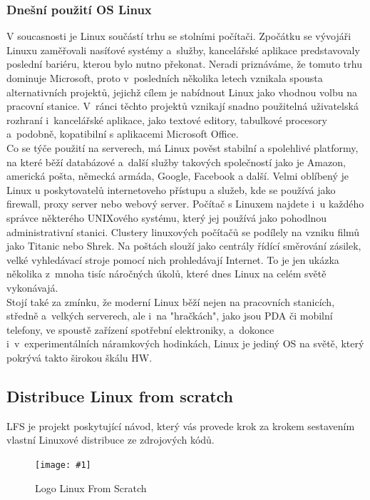 \documentclass[a4paper,12pt]{article}
\newcommand{\obr}[3]{%
	\begin{figure}[h]
	\center\texttt{[image: \#1]}
	\caption{#3}
	\end{figure}
	}
\begin{document}
\subsubsection{Dnešní použití OS Linux}
V soucasnosti je Linux součástí trhu se stolními počítači. Zpočátku se vývojáři Linuxu zaměřovali nasíťové systémy a~služby, kancelářské aplikace predstavovaly poslední bariéru, kterou bylo nutno překonat. Neradi priznáváme, že tomuto trhu dominuje Microsoft, proto v~posledních několika letech vznikala spousta alternativních projektů, jejichž cílem je nabídnout Linux jako vhodnou volbu na pracovní stanice. V~ránci těchto projektů vznikají snadno použitelná uživatelská rozhraní i~kancelářské aplikace, jako textové editory, tabulkové procesory a~podobně, kopatibilní s aplikacemi Microsoft Office.\\
Co se týče použití na serverech, má Linux pověst stabilní a spolehlivé platformy, na které běží databázové a~další služby takových společností jako je Amazon, americká pošta, německá armáda, Google, Facebook a další. Velmi oblíbený je Linux u poskytovatelů internetoveho přístupu a služeb, kde se používá jako firewall, proxy server nebo webový server. Počítač s Linuxem najdete i~u každého správce některého UNIXového systému, který jej používá jako pohodlnou administrativní stanici. Clustery linuxových počítačů se podílely na vzniku filmů jako Titanic nebo Shrek. Na poštách slouží jako centrály řídící směrování zásilek, velké vyhledávací stroje pomocí nich prohledávají Internet. To je jen ukázka několika z~mnoha tisíc náročných úkolů, které dnes Linux na celém světě vykonávajá.\\
Stojí také za zmínku, že moderní Linux běží nejen na pracovních stanicích, středně a~velkých serverech, ale i~na "hračkách", jako jsou PDA či mobilní telefony, ve spoustě zařízení spotřební elektroniky, a~dokonce i~v~experimentálních náramkových hodinkách, Linux je jediný OS na světě, který pokrývá takto širokou škálu HW.~\cite{LDP}

\newpage

\subsection{Distribuce Linux from scratch}
LFS je projekt poskytující návod, který vás provede krok za krokem sestavením vlastní Linuxové distribuce ze zdrojových kódů.~\cite{LFSwMAIN}
\obr{./img/lfs-logo.png}{1}{Logo Linux From Scratch}
\end{document}

